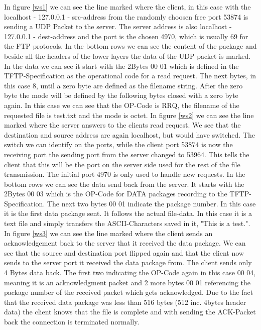 \documentclass[a4paper,12pt]{article}
\numberwithin{figure}{section}
\begin{document}
In figure \ref{ws1} we can see the line marked where the client, in this case with the localhost - 127.0.0.1 - src-address from the randomly choosen free port 53874 is sending a UDP Packet to the server. The server address is also localhost - 127.0.0.1 - dest-address and the port is the chosen 4970, which is usually 69 for the FTP protocols. In the bottom rows we can see the content of the package and beside all the headers of the lower layers the data of the UDP packet is marked. In the data we can see it start with the 2Bytes 00 01 which is defined in the TFTP-Specification as the operational code for a read request. The next bytes, in this case 8, until a zero byte are defined as the filename string. After the zero byte the mode will be defined by the following bytes closed with a zero byte again. In this case we can see that the OP-Code is RRQ, the filename of the requested file is test.txt and the mode is octet.
\newline \noindent
\newline \noindent
In figure \ref{ws2} we can see the line marked where the server answers to the clients read request. We see that the destination and source address are again localhost, but would have switched. The switch we can identify on the ports, while the client port 53874 is now the receiving port the sending port from the server changed to 53964. This tells the client that this will be the port on the server side used for the rest of the file transmission. The initial port 4970 is only used to handle new requests. In the bottom rows we can see the data send back from the server. It starts with the 2Bytes 00 03 which is the OP-Code for DATA packages recording to the TFTP-Specification. The next two bytes 00 01 indicate the package number. In this case it is the first data package sent. It follows the actual file-data. In this case it is a text file and simply transfers the ASCII-Characters saved in it, "This is a test.".
\newline \noindent
\newline \noindent
In figure \ref{ws3} we can see the line marked where the client sends an acknowledgement back to the server that it received the data package. We can see that the source and destination port flipped again and that the client now sends to the server port it received the data package from. The client sends only 4 Bytes data back. The first two indicating the OP-Code again in this case 00 04, meaning it is an acknowledgment packet and 2 more bytes 00 01 referencing the package number of the received packet which gets acknowledged. Due to the fact that the received data package was less than 516 bytes (512 inc. 4bytes header data) the client knows that the file is complete and with sending the ACK-Packet back the connection is terminated normally.
\end{document}
